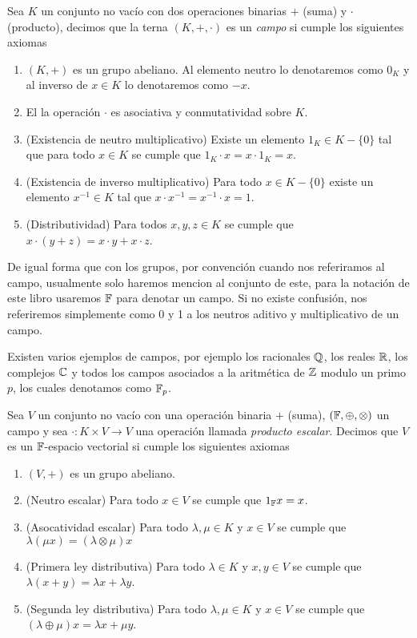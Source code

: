 \documentclass[11pt]{report}
\begin{document}
\begin{defi}
  Sea $K$ un conjunto no vacío con dos operaciones binarias $+$ (suma) y $\cdot$ (producto), decimos que la terna $(K, +, \cdot)$ es un \emph{campo} si cumple los siguientes axiomas
  \begin{enumerate}
    \item $(K,+)$ es un grupo abeliano. Al elemento neutro lo denotaremos como $0_K$ y al inverso de $x \in K$ lo denotaremos como $-x$.
    \item El la operación $\cdot$ es asociativa y conmutatividad sobre $K$.
    \item (Existencia de neutro multiplicativo) Existe un elemento $1_K \in K-\{0\}$ tal que para todo $x \in K$ se cumple que $1_K\cdot x = x\cdot 1_K = x$.
    \item (Existencia de inverso multiplicativo) Para todo $x \in K-\{0\}$ existe un elemento $ x^{-1} \in K$ tal que $x \cdot x^{-1} = x^{-1} \cdot x = 1$.
    \item (Distributividad) Para todos $x, y, z \in K$ se cumple que $x \cdot (y + z) = x \cdot y + x \cdot z$.
  \end{enumerate}
\end{defi}

De igual forma que con los grupos, por convención cuando nos referiramos al campo, usualmente solo haremos mencion al conjunto de este, para la notación de este libro usaremos $\mathbb{F}$ para denotar un campo. Si no existe confusión, nos referiremos simplemente como 0 y 1 a los neutros aditivo y multiplicativo de un campo.

Existen varios ejemplos de campos, por ejemplo los racionales $\mathbb{Q}$, los reales $\mathbb{R}$, los complejos $\mathbb{C}$ y todos los campos asociados a la aritmética de $\mathbb{Z}$ modulo un primo $p$, los cuales denotamos como $\mathbb{F}_p$.

\begin{defi}
  Sea $V$ un conjunto no vacío con una operación binaria $+$ (suma), $(\mathbb{F}, \oplus, \otimes)$ un campo y sea $\cdot\colon K \times V \to V$ una operación llamada \emph{producto escalar}. Decimos que $V$ es un $\mathbb{F}$-espacio vectorial si cumple los siguientes axiomas
  \begin{enumerate}
    \item $(V, +)$ es un grupo abeliano.
    \item (Neutro escalar) Para todo $x \in V$ se cumple que $1_{\mathbb{F}} x = x$.
    \item (Asocatividad escalar) Para todo $\lambda, \mu \in K$ y $x \in V$ se cumple que $\lambda (\mu x) = (\lambda \otimes \mu) x$
    \item (Primera ley distributiva) Para todo $\lambda \in K$ y $x,y \in V$ se cumple que $\lambda(x + y) = \lambda x + \lambda y$.
    \item (Segunda ley distributiva) Para todo $\lambda, \mu \in K$ y $x\in V$ se cumple que $(\lambda\oplus\mu)x = \lambda x + \mu y$.
  \end{enumerate}
\end{defi}
\end{document}
